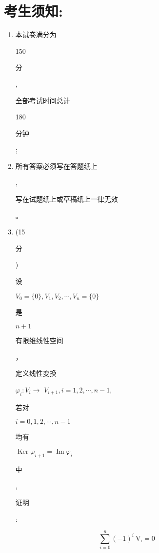 \documentclass[10pt]{article}
\begin{document}
\section{考生须知:}
\begin{enumerate}
  \item \begin{CJK}{UTF8}{mj}本试卷满分为\end{CJK} 150 \begin{CJK}{UTF8}{mj}分\end{CJK}, \begin{CJK}{UTF8}{mj}全部考试时间总计\end{CJK} 180 \begin{CJK}{UTF8}{mj}分钟\end{CJK};

  \item \begin{CJK}{UTF8}{mj}所有答案必须写在答题纸上\end{CJK}, \begin{CJK}{UTF8}{mj}写在试题纸上或草稿纸上一律无效\end{CJK}。

  \item (15 \begin{CJK}{UTF8}{mj}分\end{CJK}) \begin{CJK}{UTF8}{mj}设\end{CJK} $V_{0}=\{0\}, V_{1}, V_{2}, \cdots, V_{n}=\{0\}$ \begin{CJK}{UTF8}{mj}是\end{CJK} $n+1$ \begin{CJK}{UTF8}{mj}有限维线性空间\end{CJK}，\begin{CJK}{UTF8}{mj}定义线性变换\end{CJK} $\varphi_{i}: V_{i} \rightarrow$ $V_{i+1}, i=1,2, \cdots, n-1$, \begin{CJK}{UTF8}{mj}若对\end{CJK} $i=0,1,2, \cdots, n-1$ \begin{CJK}{UTF8}{mj}均有\end{CJK} $\operatorname{Ker} \varphi_{i+1}=\operatorname{Im} \varphi_{i}$ \begin{CJK}{UTF8}{mj}中\end{CJK}, \begin{CJK}{UTF8}{mj}证明\end{CJK}:

\end{enumerate}
$$
\sum_{i=0}^{n}(-1)^{i} \mathrm{~V}_{\mathrm{i}}=0
$$
\end{document}
